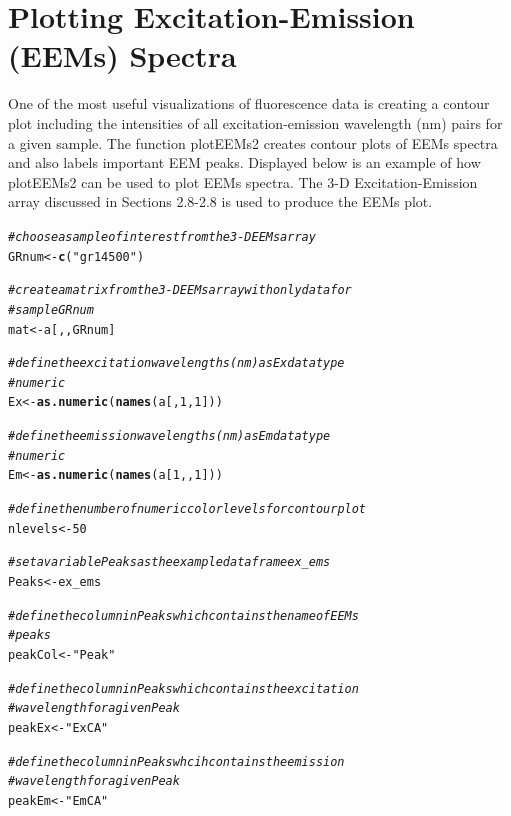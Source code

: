 \documentclass[a4paper,11pt]{article}\usepackage[]{graphicx}\usepackage[]{color}
\makeatletter
\newcommand{\hlnum}[1]{\textcolor[rgb]{0.686,0.059,0.569}{#1}}%
\newcommand{\hlstr}[1]{\textcolor[rgb]{0.192,0.494,0.8}{#1}}%
\newcommand{\hlcom}[1]{\textcolor[rgb]{0.678,0.584,0.686}{\textit{#1}}}%
\newcommand{\hlstd}[1]{\textcolor[rgb]{0.345,0.345,0.345}{#1}}%
\newcommand{\hlkwb}[1]{\textcolor[rgb]{0.69,0.353,0.396}{#1}}%
\newcommand{\hlkwd}[1]{\textcolor[rgb]{0.737,0.353,0.396}{\textbf{#1}}}%
\newenvironment{kframe}{%
 \def\at@end@of@kframe{}%
 \ifinner\ifhmode%
  \def\at@end@of@kframe{\end{minipage}}%
  \begin{minipage}{\columnwidth}%
 \fi\fi%
 \def\FrameCommand##1{\hskip\@totalleftmargin \hskip-\fboxsep
 \colorbox{shadecolor}{##1}\hskip-\fboxsep
     \hskip-\linewidth \hskip-\@totalleftmargin \hskip\columnwidth}%
 \MakeFramed {\advance\hsize-\width
   \@totalleftmargin\z@ \linewidth\hsize
   \@setminipage}}%
 {\par\unskip\endMakeFramed%
 \at@end@of@kframe}
\newenvironment{knitrout}{}{} %
\makeatother
\begin{document}
\section{Plotting Excitation-Emission (EEMs) Spectra}
One of the most useful visualizations of fluorescence data is creating a contour plot including the intensities of all excitation-emission wavelength (nm) pairs for a given sample. The function plotEEMs2 creates contour plots of EEMs spectra and also labels important EEM peaks. Displayed below is an example of how plotEEMs2 can be used to plot EEMs spectra. The 3-D Excitation-Emission array discussed in Sections 2.8-2.8 is used to produce the EEMs plot.

\begin{knitrout}
\color{fgcolor}\begin{kframe}
\begin{alltt}
\hlcom{# choose a sample of interest from the 3-D EEMs array}
\hlstd{GRnum} \hlkwb{<-} \hlkwd{c}\hlstd{(}\hlstr{"gr14500"}\hlstd{)}

\hlcom{# create a matrix from the 3-D EEMs array with only data for}
\hlcom{# sample GRnum}
\hlstd{mat} \hlkwb{<-} \hlstd{a[, , GRnum]}

\hlcom{# define the excitation wavelengths (nm) as Ex data type}
\hlcom{# numeric}
\hlstd{Ex} \hlkwb{<-} \hlkwd{as.numeric}\hlstd{(}\hlkwd{names}\hlstd{(a[,} \hlnum{1}\hlstd{,} \hlnum{1}\hlstd{]))}

\hlcom{# define the emission wavelengths (nm) as Em data type}
\hlcom{# numeric}
\hlstd{Em} \hlkwb{<-} \hlkwd{as.numeric}\hlstd{(}\hlkwd{names}\hlstd{(a[}\hlnum{1}\hlstd{, ,} \hlnum{1}\hlstd{]))}

\hlcom{# define the number of numeric color levels for contour plot}
\hlstd{nlevels} \hlkwb{<-} \hlnum{50}

\hlcom{# set a variable Peaks as the example dataframe ex_ems}
\hlstd{Peaks} \hlkwb{<-} \hlstd{ex_ems}

\hlcom{# define the column in Peaks which contains the name of EEMs}
\hlcom{# peaks}
\hlstd{peakCol} \hlkwb{<-} \hlstr{"Peak"}

\hlcom{# define the column in Peaks which contains the excitation}
\hlcom{# wavelength for a given Peak}
\hlstd{peakEx} \hlkwb{<-} \hlstr{"ExCA"}

\hlcom{# define the column in Peaks whcih contains the emission}
\hlcom{# wavelength for a given Peak}
\hlstd{peakEm} \hlkwb{<-} \hlstr{"EmCA"}


\end{alltt}
\end{kframe}
\end{knitrout}
\end{document}
